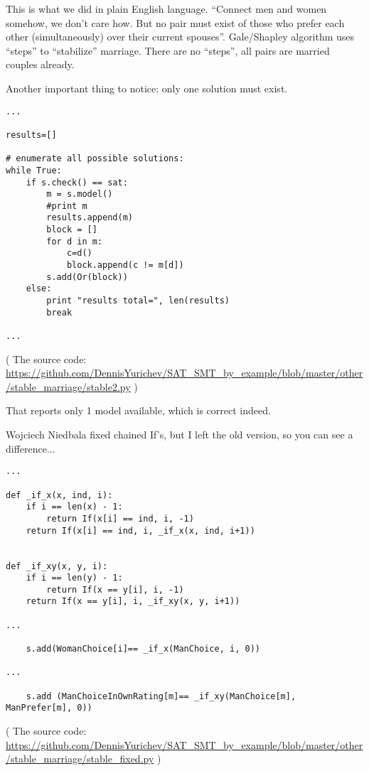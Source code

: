 This is what we did in plain English language.
``Connect men and women somehow, we don't care how.
But no pair must exist of those who prefer each other (simultaneously) over their current spouses''.
Gale/Shapley algorithm uses ``steps'' to ``stabilize'' marriage.
There are no ``steps'', all pairs are married couples already.

Another important thing to notice: only one solution must exist.

\begin{lstlisting}[style=custompy]
...

results=[]

# enumerate all possible solutions:
while True:
    if s.check() == sat:
        m = s.model()
        #print m
        results.append(m)
        block = []
        for d in m:
            c=d()
            block.append(c != m[d])
        s.add(Or(block))
    else:
        print "results total=", len(results)
        break

...
\end{lstlisting}

( The source code: \url{https://github.com/DennisYurichev/SAT_SMT_by_example/blob/master/other/stable_marriage/stable2.py} )

That reports only 1 model available, which is correct indeed.

Wojciech Niedbala fixed chained If's, but I left the old version, so you can see a difference...

\begin{lstlisting}[style=custompy]
...

def _if_x(x, ind, i):
    if i == len(x) - 1:
        return If(x[i] == ind, i, -1)
    return If(x[i] == ind, i, _if_x(x, ind, i+1))


def _if_xy(x, y, i):
    if i == len(y) - 1:
        return If(x == y[i], i, -1)
    return If(x == y[i], i, _if_xy(x, y, i+1))

...

    s.add(WomanChoice[i]== _if_x(ManChoice, i, 0))

...

    s.add (ManChoiceInOwnRating[m]== _if_xy(ManChoice[m], ManPrefer[m], 0))
\end{lstlisting}

( The source code: \url{https://github.com/DennisYurichev/SAT_SMT_by_example/blob/master/other/stable_marriage/stable_fixed.py} )

